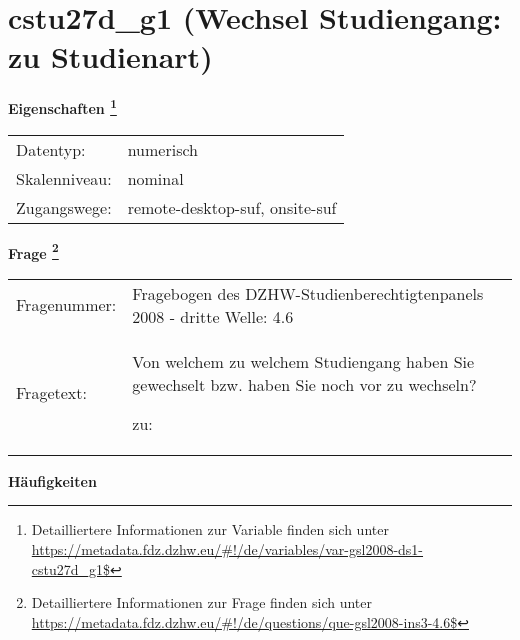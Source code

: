
    \setcounter{footnote}{0}

    \vspace*{-1.8cm}
	\section{cstu27d\_g1 (Wechsel Studiengang: zu Studienart)}
	\label{section:cstu27d_g1}



    \vspace*{0.5cm}
    \noindent\textbf{Eigenschaften
	\footnote{Detailliertere Informationen zur Variable finden sich unter
		\url{https://metadata.fdz.dzhw.eu/\#!/de/variables/var-gsl2008-ds1-cstu27d_g1$}}}\\
	\begin{tabularx}{\hsize}{@{}lX}
	Datentyp: & numerisch \\
	Skalenniveau: & nominal \\
	Zugangswege: &
	  remote-desktop-suf, 
	  onsite-suf
 \\
    \end{tabularx}



				\vspace*{0.5cm}
                \noindent\textbf{Frage
	                \footnote{Detailliertere Informationen zur Frage finden sich unter
		              \url{https://metadata.fdz.dzhw.eu/\#!/de/questions/que-gsl2008-ins3-4.6$}}}\\
				\begin{tabularx}{\hsize}{@{}lX}
					Fragenummer: &
					  Fragebogen des DZHW-Studienberechtigtenpanels 2008 - dritte Welle:
					  4.6
 \\
					Fragetext: & Von welchem zu welchem Studiengang haben Sie gewechselt bzw. haben Sie noch vor zu wechseln?\par  zu: \\
				\end{tabularx}





        		\vspace*{0.5cm}
                \noindent\textbf{Häufigkeiten}

